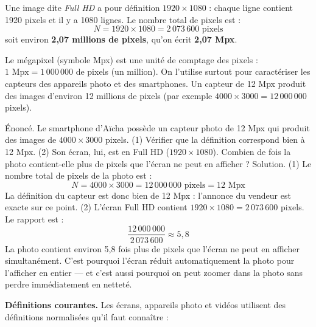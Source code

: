 \documentclass[11pt]{article}
\newcommand{\cle}[1]{{\popxbold\color{popdark}#1}}
\begin{document}
\begin{exemplebox}
Une image dite \emph{Full HD} a pour définition $1920 \times 1080$ : chaque ligne contient 1920 pixels et il y a 1080 lignes. Le nombre total de pixels est :
\[ N = 1920 \times 1080 = 2\,073\,600 \text{ pixels} \]
soit environ \textbf{2,07 millions de pixels}, qu'on écrit \textbf{2,07 Mpx}.
\end{exemplebox}

\begin{definition}[Mégapixel]
Le \cle{mégapixel} (symbole Mpx) est une unité de comptage des pixels : $1 \text{ Mpx} = 1\,000\,000$ de pixels (un million). On l'utilise surtout pour caractériser les capteurs des appareils photo et des smartphones. Un capteur de 12 Mpx produit des images d'environ 12 millions de pixels (par exemple $4000 \times 3000 = 12\,000\,000$ pixels).
\end{definition}

\begin{exoresolu}
Énoncé. Le smartphone d'Aïcha possède un capteur photo de 12 Mpx qui produit des images de $4000 \times 3000$ pixels. (1) Vérifier que la définition correspond bien à 12 Mpx. (2) Son écran, lui, est en Full HD ($1920 \times 1080$). Combien de fois la photo contient-elle plus de pixels que l'écran ne peut en afficher ?
\tcblower
Solution. (1) Le nombre total de pixels de la photo est :
\[ N = 4000 \times 3000 = 12\,000\,000 \text{ pixels} = 12 \text{ Mpx} \]
La définition du capteur est donc bien de 12 Mpx : l'annonce du vendeur est exacte sur ce point.
(2) L'écran Full HD contient $1920 \times 1080 = 2\,073\,600$ pixels. Le rapport est :
\[ \frac{12\,000\,000}{2\,073\,600} \approx 5{,}8 \]
La photo contient environ 5,8 fois plus de pixels que l'écran ne peut en afficher simultanément. C'est pourquoi l'écran réduit automatiquement la photo pour l'afficher en entier — et c'est aussi pourquoi on peut zoomer dans la photo sans perdre immédiatement en netteté.
\end{exoresolu}

\textbf{Définitions courantes.} Les écrans, appareils photo et vidéos utilisent des définitions normalisées qu'il faut connaître :
\end{document}
